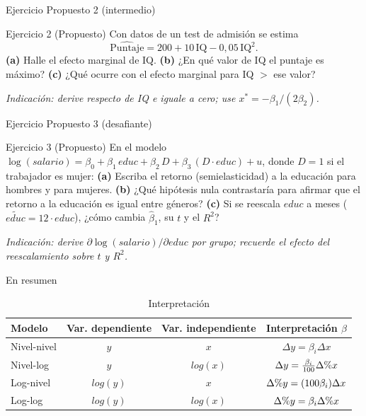 \documentclass{beamer}
\newcommand{\pc}{\text{\char37}}
\begin{document}
\begin{frame}{Ejercicio Propuesto 2 (intermedio)}

\begin{block}{Ejercicio 2 (Propuesto)}
Con datos de un test de admisión se estima
\[
\widehat{\text{Puntaje}} = 200 + 10\,\text{IQ} - 0{,}05\,\text{IQ}^2 .
\]
\textbf{(a)} Halle el efecto marginal de IQ. \quad \textbf{(b)} ¿En qué valor de IQ el puntaje es máximo? \quad \textbf{(c)} ¿Qué ocurre con el efecto marginal para IQ $>$ ese valor?
\end{block}

{\small \textit{Indicación: derive respecto de IQ e iguale a cero; use $x^*=-\beta_1/(2\beta_2)$.}}

\end{frame}

\begin{frame}{Ejercicio Propuesto 3 (desafiante)}

\begin{block}{Ejercicio 3 (Propuesto)}
En el modelo $\log(salario) = \beta_0 + \beta_1\,educ + \beta_2\,D + \beta_3\,(D\cdot educ) + u$, donde $D=1$ si el trabajador es mujer:
\textbf{(a)} Escriba el retorno (semielasticidad) a la educación para hombres y para mujeres.
\textbf{(b)} ¿Qué hipótesis nula contrastaría para afirmar que el retorno a la educación es igual entre géneros?
\textbf{(c)} Si se reescala $educ$ a meses ($\tilde{educ}=12\cdot educ$), ¿cómo cambia $\hat\beta_1$, su $t$ y el $R^2$?
\end{block}

{\small \textit{Indicación: derive $\partial\log(salario)/\partial educ$ por grupo; recuerde el efecto del reescalamiento sobre $t$ y $R^2$.}}

\end{frame}

\begin{frame}{En resumen}

\begin{table}[H]
    \centering
    \renewcommand{\arraystretch}{1.3}
    \begin{tabular}{l|c|c|c}
       Modelo  & Var. dependiente & Var. independiente & Interpretación $\beta$ \\ \hline
       Nivel-nivel  & $y$ & $x$ & $\Delta y = \beta_i \Delta x$\\
       Nivel-log  & $y$ & $log(x)$ & $\Delta y = \frac{\beta_i}{100} \Delta \pc  x$ \\
       Log-nivel  & $log(y)$ & $x$ & $ \Delta\pc  y = (100 \beta_i) \Delta x$\\
       Log-log  & $log(y)$ & $log(x)$ & $ \Delta \pc  y = \beta_i \Delta \pc x$\\
    \end{tabular}
    \caption{Interpretación}
    \label{tab:my_label}
\end{table}

\end{frame}
\end{document}
